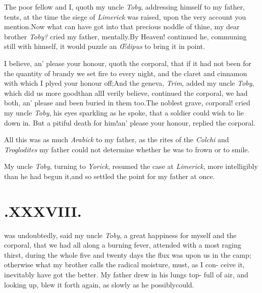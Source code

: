 \documentclass{article}
\begin{document}
The poor fellow and I, quoth my uncle \textit{Toby}, addressing
himself to my father, 
tents, at the time the siege of \textit{Limerick} was raised,
upon the very account you mention.\tsh Now what can
have got\break
into that precious noddle of thine, my dear brother
\textit{Toby?} cried my father,\break 
mentally.\tsh By Heaven! continued\break
he, communing still with himself, it\break
would puzzle an \textit{Œdipus} to bring it in\break
point.\tsh

I believe, an’ please your honour,\break
quoth the corporal, that if
it had not been for the quantity of brandy we set fire to every
night, and the claret and cinnamon with which I plyed your
honour off;\tsk And the geneva, \textit{Trim}, added my uncle
\textit{Toby}, which did us more good\break than all\tsh I verily
believe, continued 
the corporal, we had both, an’ please\break
{}\break
and been buried in them too.\tsh The\break
noblest grave, corporal!  cried my uncle\break
\textit{Toby}, his eyes sparkling as he spoke, that\break
a soldier could wish to lie down in.\tsh\break
But a pitiful death for him!\@ an’ please\break
your honour, replied the corporal.

All this was as much \textit{Arabick} to my father, as the rites
of the \textit{Colchi} and \textit{Tro\-glodites}
\break
my father could not determine whether he was to
frown or to smile.\tsh

My uncle \textit{Toby}, turning to \textit{Yorick},\break
resumed the case
at \textit{Limerick}, more intelligibly than he had begun
it,\tsk and so settled the point for my father at once.

\vfill
{}
\newpage
\null\smallskip

\section{.\enspace  XXXVIII.}

 was undoubtedly, said my uncle\break
\textit{Toby}, a great happiness for myself\break
and the corporal, that we
had all along a burning fever, attended with a most raging thirst,
during the whole five and twenty days the flux was upon us in the
camp; otherwise what my brother calls the radical moisture,
must, as I con-\break 
ceive it, inevitably have got the better.\break
\tsh My father drew in his lungs top-\break
full of air, and looking up, blew it\break
forth again, as slowly as he possibly\break could.\tsh
\end{document}

